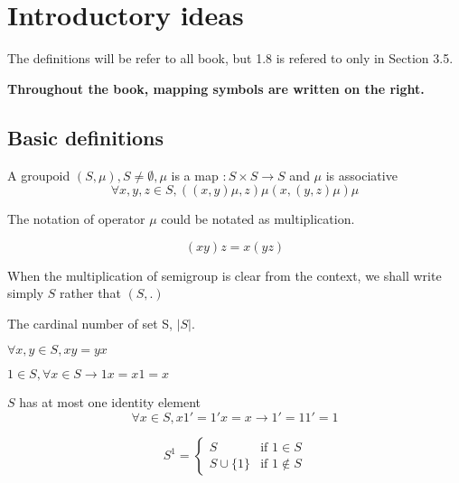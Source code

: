 \section[1]{Introductory ideas}
The definitions will be refer to all book, but 1.8 is refered to only in Section 3.5.

\textbf{Throughout the book, mapping symbols are written on the right.}

\subsection[1]{Basic definitions}

\begin{Def}[Semigroup]
    A groupoid $(S,\mu), S \neq \emptyset, \mu$ is a map $: S\times S \to S$ and $\mu$ is associative
    \begin{equation}
        \forall x,y,z \in S, ((x,y)\mu,z)\mu (x,(y,z)\mu)\mu
    \end{equation}
\end{Def}

The notation of operator $\mu$ could be notated as multiplication.

$$(x y)z=x(y z)$$

When the multiplication of semigroup is clear from the context, we shall write simply $S$ rather that $(S,.)$

\begin{Def}
    The cardinal number of set S, $|S|$.
\end{Def}

\begin{Def}
    $\forall x,y \in S, x y = y x$
\end{Def}

\begin{Def}[Identity]
    $1\in S, \forall x \in S \to 1x=x1=x $
\end{Def}

$S$ has at most one identity element
$$\forall x \in S, x1'=1'x=x \to 1'=11' =1$$


\begin{Sym}[$S^{1}$]
    \[
        S^1 =
        \begin{cases}
            S               &   \text{if } 1 \in S  \\
            S \cup \{1\}    &   \text{if } 1 \notin S
        \end{cases}
    \]
\end{Sym}

